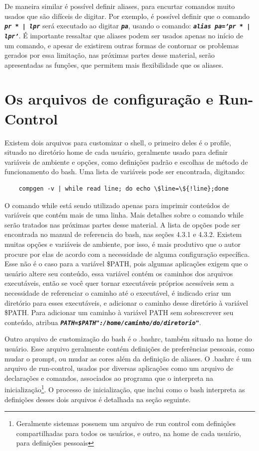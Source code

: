 \documentclass[oneside, 11 pt]{article}
\begin{document}
	De maneira similar é possível definir aliases, para encurtar comandos muito usados que são difíceis de digitar. Por exemplo, é possível definir que o comando \texttt{\textbf{\textit{pr * | lpr}}} será executado ao digitar \texttt{\textbf{\textit{pa}}}, usando o comando: \texttt{\textbf{\textit{alias pa='pr * | lpr'}}}. É importante ressaltar que aliases podem ser usados apenas no início de um comando, e apesar de existirem outras formas de contornar os problemas gerados por essa limitação, nas próximas partes desse material, serão apresentadas as funções, que permitem mais flexibilidade que os aliases.
	
	\section{Os arquivos de configuração e Run-Control}
	Existem dois arquivos para customizar o shell, o primeiro deles é o profile, situado no diretório home de cada usuário, geralmente usado para definir variáveis de ambiente e opções, como definições padrão e escolhas de método de funcionamento do bash. Uma lista de variáveis pode ser encontrada, digitando:
	\begin{lstlisting}
	compgen -v | while read line; do echo \$line=\${!line};done
	\end{lstlisting}
	O comando while está sendo utilizado apenas para imprimir conteúdos de variáveis que contém mais de uma linha. Mais detalhes sobre o comando while serão tratados nas próximas partes desse material.
	A lista de opções pode ser encontrada no manual de referencia do bash\cite{bashman}, nas seções 4.3.1 e 4.3.2.
	Existem muitas opções e variáveis de ambiente, por isso, é mais produtivo que o autor procure por elas de acordo com a necessidade de alguma configuração específica. Esse não é o caso para a variável \$PATH, pois algumas aplicações exigem que o usuário altere seu conteúdo, essa variável contém os caminhos dos arquivos executáveis, então se você quer tornar executáveis próprios acessíveis sem a necessidade de referenciar o caminho até o executável, é indicado criar um diretório para esses executáveis, e adicionar o caminho desse diretório à variável \$PATH. Para adicionar um caminho à variável PATH sem sobrescrever seu conteúdo, atribua \texttt{\textbf{\textit{PATH=\$PATH":/home/caminho/do/diretorio"}}}.
	
	Outro arquivo de customização do bash é o .bashrc, também situado na home do usuário. Esse arquivo geralmente contém definições de preferências pessoais, como mudar o prompt, ou mudar as cores além da definição de aliases. O .bashrc é um arquivo de run-control, usados por diversas aplicações como um arquivo de declarações e comandos, associados ao programa que o interpreta na inicialização\footnote[3]{Geralmente sistemas possuem um arquivo de run control com definições compartilhadas para todos os usuários, e outro, na home de cada usuário, para definições pessoais}. O processo de inicialização, que inclui como o bash interpreta as definições desses dois arquivos é detalhada na seção seguinte.
	
\end{document}
